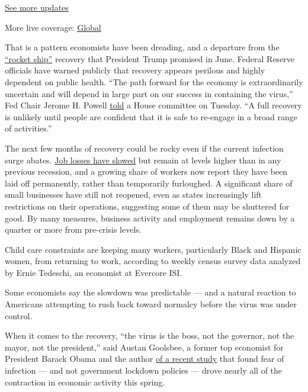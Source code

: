 \href{https://www.nytimes.com/live/2020/07/31/business/stock-market-today-coronavirus?action=click\&pgtype=Article\&state=default\&region=MAIN_CONTENT_1\&context=storylines_live_updates}{See
more updates}

More live coverage:
\href{https://www.nytimes.com/2020/08/01/world/coronavirus-covid-19.html?action=click\&pgtype=Article\&state=default\&region=MAIN_CONTENT_1\&context=storylines_live_updates}{Global}

That is a pattern economists have been dreading, and a departure from
the \href{https://www.youtube.com/watch?v=PVI0yw5olOQ}{``rocket ship''}
recovery that President Trump promised in June. Federal Reserve
officials have warned publicly that recovery appears perilous and highly
dependent on public health. ``The path forward for the economy is
extraordinarily uncertain and will depend in large part on our success
in containing the virus,'' Fed Chair Jerome H. Powell
\href{https://www.nytimes.com/2020/06/30/us/politics/mnuchin-powell-congress-economic-recovery.html}{told}
a House committee on Tuesday. ``A full recovery is unlikely until people
are confident that it is safe to re-engage in a broad range of
activities.''

The next few months of recovery could be rocky even if the current
infection surge abates.
\href{https://www.nytimes.com/2020/06/18/business/economy/coronavirus-unemployment-claims.html}{Job
losses have slowed} but remain at levels higher than in any previous
recession, and a growing share of workers now report they have been laid
off permanently, rather than temporarily furloughed. A significant share
of small businesses have still not reopened, even as states increasingly
lift restrictions on their operations, suggesting some of them may be
shuttered for good. By many measures, business activity and employment
remains down by a quarter or more from pre-crisis levels.

Child care constraints are keeping many workers, particularly Black and
Hispanic women, from returning to work, according to weekly census
survey data analyzed by Ernie Tedeschi, an economist at Evercore ISI.

Some economists say the slowdown was predictable --- and a natural
reaction to Americans attempting to rush back toward normalcy before the
virus was under control.

When it comes to the recovery, ``the virus is the boss, not the
governor, not the mayor, not the president,'' said Austan Goolsbee, a
former top economist for President Barack Obama and the author
\href{https://bfi.uchicago.edu/working-paper/2020-80/}{of a recent
study} that found fear of infection --- and not government lockdown
policies --- drove nearly all of the contraction in economic activity
this spring.

